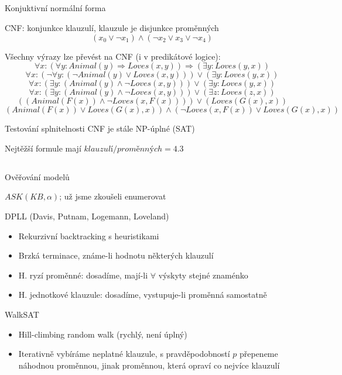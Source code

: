 \documentclass{beamer}
\begin{document}
\subsection{}
\begin{frame}{Konjuktivní normální forma}
\begin{center}
CNF: konjunkce klauzulí, klauzule je disjunkce proměnných
$$(x_0 \lor \lnot x_1) \land (\lnot x_2 \lor x_3 \lor \lnot x_4)$$

Všechny výrazy lze převést na CNF (i v predikátové logice):
$$ \forall x: (\forall y: Animal(y) \Rightarrow Loves(x, y)) \Rightarrow (\exists y: Loves(y, x))$$
$$ \forall x: (\lnot \forall y: (\lnot Animal(y) \lor Loves(x,y))) \lor (\exists y: Loves(y, x)) $$
$$ \forall x: (\exists y: (Animal(y) \land \lnot Loves(x, y))) \lor (\exists y: Loves(y, x)) $$
$$ \forall x: (\exists y: (Animal(y) \land \lnot Loves(x, y))) \lor (\exists z: Loves(z, x)) $$
$$ ((Animal(F(x)) \land \lnot Loves(x, F(x)))) \lor (Loves(G(x), x)) $$
$$ (Animal(F(x)) \lor Loves(G(x), x)) \land (\lnot Loves(x, F(x)) \lor Loves(G(x),x)) $$

Testování splnitelnosti CNF je stále NP-úplné (SAT)

Nejtěžší formule mají $klauzulí/proměnných=4.3$
\end{center}
\end{frame}

\subsection{}
\begin{frame}{Ověřování modelů}
\begin{center}
$ASK(KB, \alpha)$; už jsme zkoušeli enumerovat
\end{center}

\begin{block}{DPLL (Davis, Putnam, Logemann, Loveland)}
\begin{itemize}
\item Rekurzivní backtracking s heuristikami
\item Brzká terminace, známe-li hodnotu některých klauzulí
\item H. ryzí proměnné: dosadíme, mají-li $\forall$ výskyty stejné znaménko
\item H. jednotkové klauzule: dosadíme, vystupuje-li proměnná samostatně
\end{itemize}
\end{block}

\begin{block}{WalkSAT}
\begin{itemize}
\item Hill-climbing random walk (rychlý, není úplný)
\item Iterativně vybíráme neplatné klauzule, s pravděpodobností $p$ přepeneme náhodnou proměnnou, jinak proměnnou, která opraví co nejvíce klauzulí
\end{itemize}
\end{block}
\end{frame}
\end{document}
